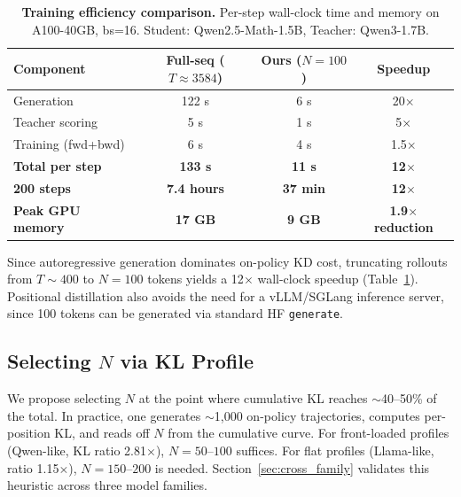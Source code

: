 \documentclass[10pt]{article}
\begin{document}
\begin{table}[t]
\centering
\caption{\textbf{Training efficiency comparison.} Per-step wall-clock time and memory on A100-40GB, bs=16. Student: Qwen2.5-Math-1.5B, Teacher: Qwen3-1.7B.}
\label{tab:timing}
\small
\begin{tabular}{lccc}
\toprule
\textbf{Component} & \textbf{Full-seq ($T{\approx}3584$)} & \textbf{Ours ($N{=}100$)} & \textbf{Speedup} \\
\midrule
Generation & 122 s & 6 s & 20$\times$ \\
Teacher scoring & 5 s & 1 s & 5$\times$ \\
Training (fwd+bwd) & 6 s & 4 s & 1.5$\times$ \\
\midrule
\textbf{Total per step} & \textbf{133 s} & \textbf{11 s} & \textbf{12$\times$} \\
\textbf{200 steps} & \textbf{7.4 hours} & \textbf{37 min} & \textbf{12$\times$} \\
\textbf{Peak GPU memory} & \textbf{17 GB} & \textbf{9 GB} & \textbf{1.9$\times$ reduction} \\
\bottomrule
\end{tabular}
\end{table}

Since autoregressive generation dominates on-policy KD cost, truncating rollouts from $T{\sim}400$ to $N{=}100$ tokens yields a 12$\times$ wall-clock speedup (Table~\ref{tab:timing}). Positional distillation also avoids the need for a vLLM/SGLang inference server, since 100 tokens can be generated via standard HF \texttt{generate}.

\subsection{Selecting $N$ via KL Profile}
\label{sec:selecting_n}

We propose selecting $N$ at the point where cumulative KL reaches ${\sim}$40--50\% of the total. In practice, one generates ${\sim}$1{,}000 on-policy trajectories, computes per-position KL, and reads off $N$ from the cumulative curve. For front-loaded profiles (Qwen-like, KL ratio 2.81$\times$), $N{=}50$--$100$ suffices. For flat profiles (Llama-like, ratio 1.15$\times$), $N{=}150$--$200$ is needed. Section~\ref{sec:cross_family} validates this heuristic across three model families.


\end{document}

